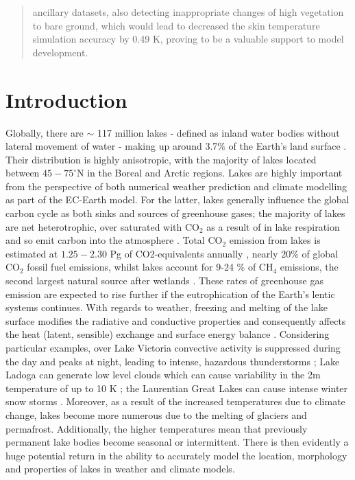 \documentclass[hess, twostagejnl]{copernicus}
\begin{document}
\begin{abstract}
ancillary datasets, also detecting inappropriate changes of high vegetation to bare ground, which would lead to decreased the skin temperature simulation accuracy by 0.49 K, proving to be a valuable support to model development.
\end{abstract}




\section{Introduction}
\noindent Globally, there are $\sim$ 117 million lakes - defined as inland water bodies without lateral movement of water - making up around 3.7$\%$ of the Earth's land surface \citep{Verpoorter2014}. Their distribution is highly anisotropic, with the majority of lakes located between $45-75^{\circ}$N in the Boreal and Arctic regions. Lakes are highly important from the perspective of both numerical weather prediction and climate modelling as part of the EC-Earth model. For the latter, lakes generally influence the global carbon cycle as both sinks and sources of greenhouse gases; the majority of lakes are net heterotrophic, over saturated with CO$_2$ as a result of in lake respiration and so emit carbon into the atmosphere \citep{Pace2005,Tranvik2009}.  Total CO$_2$ emission from lakes is estimated at $1.25 - 2.30$ Pg of CO2-equivalents annually \citep{DelSontro2018}, nearly $20 \%$ of global CO$_2$ fossil fuel emissions, whilst lakes account for 9-24 $\%$  of CH$_4$ emissions, the second largest natural source after wetlands \citep{Saunois2020}. These rates of greenhouse gas emission are expected to rise further if the eutrophication of the Earth's lentic systems continues. With regards to weather, freezing and melting of the lake surface modifies the radiative and conductive properties and consequently affects the heat (latent, sensible) exchange and surface energy balance \citep{Huang2019,Peng2020,Franz2018}. Considering particular examples, over Lake Victoria convective activity is suppressed during the day and peaks at night, leading to intense, hazardous thunderstorms \citep{Thiery2015,Thiery_2017}; Lake Ladoga can generate low level clouds which can cause variability in the 2m temperature of up to 10 K \citep{Eerola2014}; the Laurentian Great Lakes can cause intense winter snow storms \citep{Vavrus2013} \citep{Notaro2013}. Moreover, as a result of the increased temperatures due to climate change, lakes become more numerous due to the melting of glaciers and permafrost. Additionally, the higher temperatures mean that previously permanent lake bodies become seasonal or intermittent. There is then evidently a huge potential return in the ability to accurately model the location, morphology and properties of lakes in weather and climate models. \newline 
\end{document}
